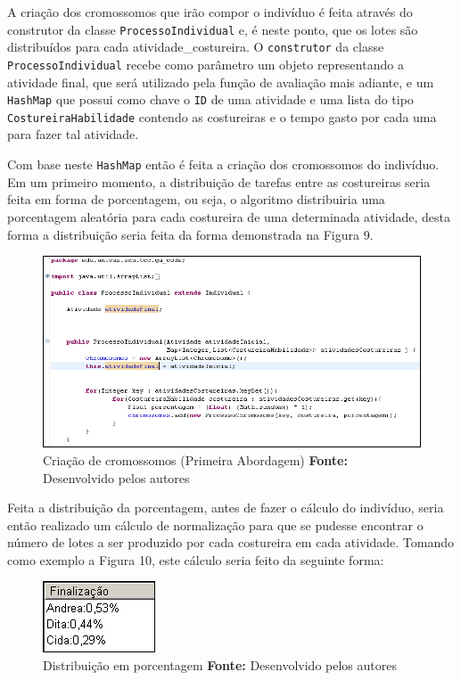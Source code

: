 \par A criação dos cromossomos que irão compor o indivíduo é feita através do construtor da classe 
\texttt{ProcessoIndividual} e, é neste ponto, que os lotes são distribuídos para
cada atividade\_costureira.
O \texttt{construtor} da classe \texttt{ProcessoIndividual} recebe como
parâmetro um objeto representando a atividade final, que será utilizado pela função de avaliação mais adiante, e um \texttt{HashMap} que possui como chave o
\texttt{ID} de uma atividade e uma lista do  tipo \texttt{CostureiraHabilidade} contendo as costureiras e o tempo 
gasto por cada uma para fazer tal atividade.

\par Com base neste \texttt{HashMap} então é feita a criação dos cromossomos do indivíduo.
Em um primeiro momento, a distribuição de tarefas entre as costureiras seria feita em forma 
de porcentagem, ou seja, o algoritmo distribuiria uma porcentagem aleatória para cada costureira de 
uma determinada atividade, desta forma a distribuição seria feita da forma demonstrada na Figura 9.


\begin{figure}[h!]
	\centerline{\includegraphics[scale=0.7]{./imagens/tentativa_1_individual.png}}
	\caption[Classe CostureiraHabilidade]
	{Criação de cromossomos (Primeira Abordagem) \textbf{Fonte:} Desenvolvido pelos autores}
	\label{fig:exemplo1}
\end{figure}
 
\par Feita a distribuição da porcentagem, antes de fazer o cálculo do indivíduo, seria então realizado 
um cálculo de normalização para que se pudesse encontrar o número de lotes a ser
produzido por cada costureira em cada atividade. Tomando como exemplo a Figura 10, este cálculo seria feito da seguinte forma:

\begin{figure}[h!]
	\centerline{\includegraphics[scale=1.0]{./imagens/distribuicao_porcentagem.png}}
	\caption[Classe CostureiraHabilidade]
	{Distribuição em porcentagem \textbf{Fonte:} Desenvolvido pelos autores}
	\label{fig:exemplo1}
\end{figure}

